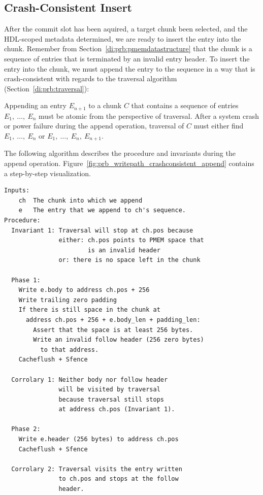 \documentclass[12pt,a4paper,twoside]{book}
\begin{document}
\subsection{Crash-Consistent Insert}\label{di:prb:write:crashconsistency}
After the commit slot has been aquired, a target chunk been selected, and the HDL-scoped metadata determined, we are ready to insert the entry into the chunk.
Remember from Section~\ref{di:prb:pmemdatastructure} that the chunk is a sequence of entries that is terminated by an invalid entry header.
To insert the entry into the chunk, we must append the entry to the sequence in a way that is crash-consistent with regards to the traversal algorithm (Section~\ref{di:prb:traversal}):
\begin{displayquote}
    Appending an entry $E_{n+1}$ to a chunk $C$ that contains a sequence of entries $E_1,~\dots,~E_n$ must be atomic from the perspective of traversal.
    After a system crash or power failure during the append operation, traversal of $C$ must either find $E_1,~\dots,~E_n$ or $E_1,~\dots,~E_n,~E_{n+1}$.
\end{displayquote}
The following algorithm describes the procedure and invariants during the append operation.
Figure~\ref{fig:prb_writepath_crashconsistent_append} contains a step-by-step visualization.
\begin{lstlisting}[style=figurepseudocode]
Inputs:
    ch  The chunk into which we append
    e   The entry that we append to ch's sequence.
Procedure:
  Invariant 1: Traversal will stop at ch.pos because
               either: ch.pos points to PMEM space that
                       is an invalid header
               or: there is no space left in the chunk

  Phase 1:
    Write e.body to address ch.pos + 256
    Write trailing zero padding
    If there is still space in the chunk at
      address ch.pos + 256 + e.body_len + padding_len:
        Assert that the space is at least 256 bytes.
        Write an invalid follow header (256 zero bytes)
          to that address.
    Cacheflush + Sfence

  Corrolary 1: Neither body nor follow header
               will be visited by traversal
               because traversal still stops
               at address ch.pos (Invariant 1).

  Phase 2:
    Write e.header (256 bytes) to address ch.pos
    Cacheflush + Sfence

  Corrolary 2: Traversal visits the entry written
               to ch.pos and stops at the follow
               header.
\end{lstlisting}
\end{document}
